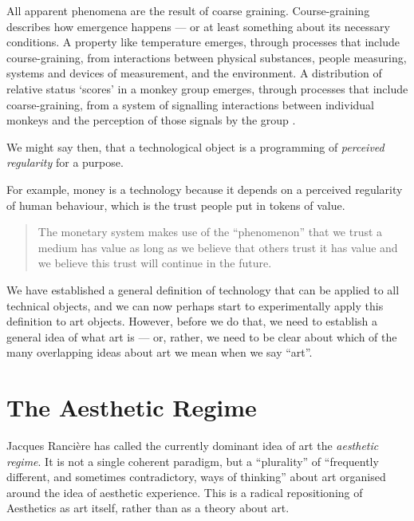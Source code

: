 \documentclass[letterpaper]{article}
\begin{document}
    All apparent phenomena are the result of coarse graining. Course-graining describes how emergence happens — or at least something about its necessary conditions. A property like temperature emerges, through processes that include course-graining, from interactions between physical substances, people measuring, systems and devices of measurement, and the environment. A distribution of relative status ‘scores’ in a monkey group emerges, through processes that include coarse-graining, from a system of signalling interactions between individual monkeys and the perception of those signals by the group \citep{FlackCntxtMdltsSgnlMnng2007}.
    
    We might say then, that a technological object is a programming of \emph{perceived regularity} for a purpose.

    For example, money is a technology because it depends on a perceived regularity of human behaviour, which is the trust people put in tokens of value.

    \begin{quote}
        The monetary system makes use of the “phenomenon” that we trust a medium has value as long as we believe that others trust it has value and we believe this trust will continue in the future. \citep[p.55]{theNatureOfTechnology2009}
    \end{quote}

    We have established a general definition of technology that can be applied to all technical objects, and we can now perhaps start to experimentally apply this definition to art objects. However, before we do that, we need to establish a general idea of what art is — or, rather, we need to be clear about which of the many overlapping ideas about art we mean when we say “art”.

\section{The Aesthetic Regime}

    Jacques Rancière has called the currently dominant idea of art the \emph{aesthetic regime}. It is not a single coherent paradigm, but a “plurality” of “frequently different, and sometimes contradictory, ways of thinking” \citep[p.8]{RanciereMdrnTms2022} about art organised around the idea of aesthetic experience. This is a radical repositioning of Aesthetics as art itself, rather than as a theory about art.
    
\end{document}
